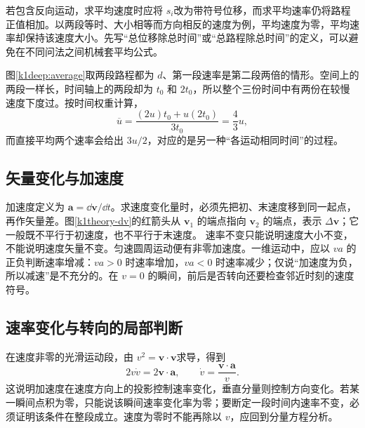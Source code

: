 若包含反向运动，求平均速度时应将 $s_i$改为带符号位移，而求平均速率仍将路程正值相加。以两段等时、大小相等而方向相反的速度为例，平均速度为零，平均速率却保持该速度大小。先写“总位移除总时间”或“总路程除总时间”的定义，可以避免在不同问法之间机械套平均公式。


图\ref{k1deep:average}取两段路程都为 $d$、第一段速率是第二段两倍的情形。空间上的两段一样长，时间轴上的两段却为 $t_0$ 和 $2t_0$，所以整个三份时间中有两份在较慢速度下度过。按时间权重计算，
\[
 \overline u=\frac{(2u)t_0+u(2t_0)}{3t_0}=\frac43u,
\]
而直接平均两个速率会给出 $3u/2$，对应的是另一种“各运动相同时间”的过程。


\subsection{矢量变化与加速度}
加速度定义为 $\bm a=\dd\bm v/\dd t$。求速度变化量时，必须先把初、末速度移到同一起点，再作矢量差。图\ref{k1theory-dv}的红箭头从 $\bm v_1$ 的端点指向 $\bm v_2$ 的端点，表示 $\Delta\bm v$；它一般既不平行于初速度，也不平行于末速度。
速率不变只能说明速度大小不变，不能说明速度矢量不变。匀速圆周运动便有非零加速度。一维运动中，应以 $va$ 的正负判断速率增减：$va>0$ 时速率增加，$va<0$ 时速率减少；仅说“加速度为负，所以减速”是不充分的。在 $v=0$ 的瞬间，前后是否转向还要检查邻近时刻的速度符号。

\subsection{速率变化与转向的局部判断}
在速度非零的光滑运动段，由 $v^2=\bm v\cdot\bm v$求导，得到
\[2v\dot v=2\bm v\cdot\bm a,\qquad \dot v=\frac{\bm v\cdot\bm a}{v}.\]
这说明加速度在速度方向上的投影控制速率变化，垂直分量则控制方向变化。若某一瞬间点积为零，只能说该瞬间速率变化率为零；要断定一段时间内速率不变，必须证明该条件在整段成立。速度为零时不能再除以 $v$，应回到分量方程分析。

